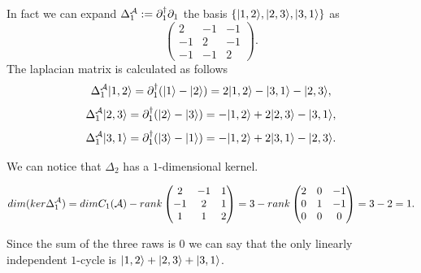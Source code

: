 \documentclass[../2.tex]{subfiles}
\begin{document}
    \begin{exa}
        In fact we can expand $\Delta_1^{\mathcal{A}} := \partial_1^\dagger\partial_1$ the basis $\{| 1,2 \rangle,| 2,3 \rangle,| 3,1 \rangle\}$ as
        \[\begin{pmatrix}
            2 & -1 & -1  \\
            -1 & 2 & -1  \\
            -1& -1 & 2 
        \end{pmatrix}.\] 
        The laplacian matrix is calculated as follows
        \[\Delta_1^{\mathcal{A}}| 1,2 \rangle = \partial_1^\dagger(| 1 \rangle-| 2 \rangle) = 2| 1,2 \rangle-| 3,1 \rangle-| 2,3 \rangle,\]
        \[\Delta_1^{\mathcal{A}}| 2,3 \rangle = \partial_1^\dagger(| 2 \rangle-| 3 \rangle) = -| 1,2 \rangle+2| 2,3 \rangle-| 3,1 \rangle,\]
        \[\Delta_1^{\mathcal{A}}| 3,1 \rangle = \partial_1^\dagger(| 3 \rangle-| 1 \rangle) = -| 1,2 \rangle+2| 3,1 \rangle-| 2,3 \rangle.\]

        We can notice that $\Delta_2$ has a $1$-dimensional kernel.

        \[ dim(ker\Delta_1^{\mathcal{A}}) = dimC_1(\mathcal{A}) - rank
            \begin{pmatrix}
                2 & -1 & 1  \\
                -1 & 2 & 1  \\
                1& 1 & 2 
            \end{pmatrix} = 3 - rank
            \begin{pmatrix}
                2 & 0 & -1  \\
                0 & 1 & -1  \\
                0 & 0 & 0 
            \end{pmatrix} = 3 - 2 =  1. \]

        Since the sum of the three raws is $0$ we can say that the only linearly independent $1$-cycle is $| 1,2 \rangle+| 2,3 \rangle+| 3,1 \rangle$.
    \end{exa}
\end{document}
